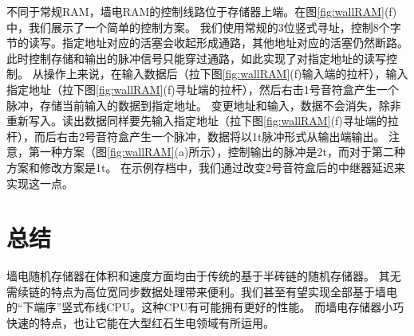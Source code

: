 \documentclass[UTF8,12pt,punct=kaiming,fontset=none]{article}
\begin{document}
不同于常规RAM，墙电RAM的控制线路位于存储器上端。在图\ref{fig:wallRAM}(f)中，我们展示了一个简单的控制方案。
我们使用常规的3位竖式寻址，控制8个字节的读写。指定地址对应的活塞会收起形成通路，其他地址对应的活塞仍然断路。
此时控制存储和输出的脉冲信号只能穿过通路，如此实现了对指定地址的读写控制。
从操作上来说，在输入数据后（拉下图\ref{fig:wallRAM}(f)输入端的拉杆），输入指定地址（拉下图\ref{fig:wallRAM}(f)寻址端的拉杆），然后右击1号音符盒产生一个脉冲，存储当前输入的数据到指定地址。
变更地址和输入，数据不会消失，除非重新写入。读出数据同样要先输入指定地址（拉下图\ref{fig:wallRAM}(f)寻址端的拉杆），而后右击2号音符盒产生一个脉冲，数据将以1t脉冲形式从输出端输出。
注意，第一种方案（图\ref{fig:wallRAM}(a)所示），控制输出的脉冲是2t，而对于第二种方案和修改方案是1t。
在示例存档中，我们通过改变2号音符盒后的中继器延迟来实现这一点。

\section{总结}
墙电随机存储器在体积和速度方面均由于传统的基于半砖链的随机存储器。
其无需续链的特点为高位宽同步数据处理带来便利。我们甚至有望实现全部基于墙电的“下端序”竖式布线CPU。这种CPU有可能拥有更好的性能。
而墙电存储器小巧快速的特点，也让它能在大型红石生电领域有所运用。



\end{document}
